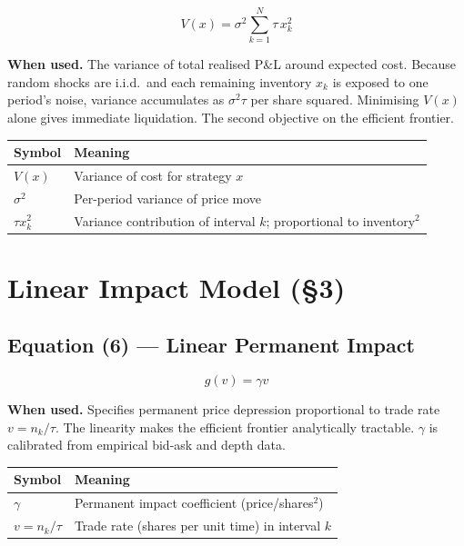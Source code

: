 \documentclass[11pt,a4paper]{article}
\begin{document}
\begin{equation}
  V(x) = \sigma^2 \sum_{k=1}^{N} \tau\,x_k^2
\end{equation}

\textbf{When used.} The variance of total realised P\&L around expected cost.  Because
random shocks are i.i.d.\ and each remaining inventory $x_k$ is exposed to one period's
noise, variance accumulates as $\sigma^2\tau$ per share squared.  Minimising $V(x)$ alone
gives immediate liquidation.  The second objective on the efficient frontier.

\begin{center}
\begin{tabular}{@{}L{3.5cm}L{10cm}@{}}
\toprule
\textbf{Symbol} & \textbf{Meaning} \\
\midrule
$V(x)$ & Variance of cost for strategy $x$ \\
$\sigma^2$ & Per-period variance of price move \\
$\tau x_k^2$ & Variance contribution of interval $k$; proportional to inventory$^2$ \\
\bottomrule
\end{tabular}
\end{center}

\section{Linear Impact Model (\texorpdfstring{\S}{§}3)}

\subsection*{Equation (6) — Linear Permanent Impact}

\begin{equation}
  g(v) = \gamma v
\end{equation}

\textbf{When used.} Specifies permanent price depression proportional to trade rate
$v=n_k/\tau$.  The linearity makes the efficient frontier analytically tractable.
$\gamma$ is calibrated from empirical bid-ask and depth data.

\begin{center}
\begin{tabular}{@{}L{3.5cm}L{10cm}@{}}
\toprule
\textbf{Symbol} & \textbf{Meaning} \\
\midrule
$\gamma$ & Permanent impact coefficient (price/shares$^2$) \\
$v = n_k/\tau$ & Trade rate (shares per unit time) in interval $k$ \\
\bottomrule
\end{tabular}
\end{center}
\end{document}
